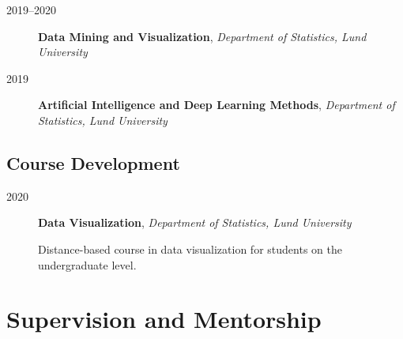 \documentclass[
  10pt,
  headsepline=true,
  english,
  DIV=12
]{scrartcl}
\renewcommand*{%
  \mkbibnamegiven
}[1]{\ifitemannotation{highlight}{\textbf{#1}}{#1}}
\renewcommand*{%
  \mkbibnamefamily
}[1]{\ifitemannotation{highlight}{\textbf{#1}}{#1}}
\begin{document}
\begin{description}

  \item[2019--2020]{
        \textbf{Data Mining and Visualization}, \emph{Department of Statistics,
          Lund University}

        }

  \item[2019]{
        \textbf{Artificial Intelligence and Deep Learning Methods},
        \emph{Department of Statistics, Lund University}

        }

\end{description}

\subsection{Course Development}

\begin{description}
  \item[2020]{
        \textbf{Data Visualization}, \emph{Department of Statistics, Lund
          University}

        Distance-based course in data visualization for students on
        the undergraduate level.
        }
\end{description}

\hypertarget{supervision}{%
  \section{Supervision and Mentorship}\label{supervision}}
\end{document}
